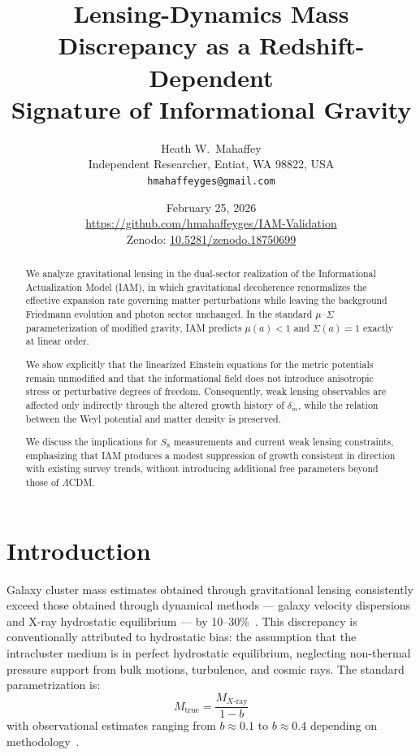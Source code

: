 \documentclass[12pt,a4paper]{article}
\title{Lensing-Dynamics Mass Discrepancy as a Redshift-Dependent\\
Signature of Informational Gravity}
\author{Heath W.\ Mahaffey\\
\small Independent Researcher, Entiat, WA 98822, USA\\
\small \texttt{hmahaffeyges@gmail.com}}
\date{February 25, 2026\\
\small \url{https://github.com/hmahaffeyges/IAM-Validation}\\
\small Zenodo: \href{https://doi.org/10.5281/zenodo.18750699}{10.5281/zenodo.18750699}}
\begin{document}
\maketitle


\begin{abstract}
We analyze gravitational lensing in the dual-sector realization of the
Informational Actualization Model (IAM), in which gravitational decoherence
renormalizes the effective expansion rate governing matter perturbations
while leaving the background Friedmann evolution and photon sector unchanged.
In the standard $\mu$--$\Sigma$ parameterization of modified gravity,
IAM predicts $\mu(a) < 1$ and $\Sigma(a) = 1$ exactly at linear order.

We show explicitly that the linearized Einstein equations for the metric
potentials remain unmodified and that the informational field does not
introduce anisotropic stress or perturbative degrees of freedom.
Consequently, weak lensing observables are affected only indirectly through
the altered growth history of $\delta_m$, while the relation between the
Weyl potential and matter density is preserved.

We discuss the implications for $S_8$ measurements and current weak lensing
constraints, emphasizing that IAM produces a modest suppression of growth
consistent in direction with existing survey trends, without introducing
additional free parameters beyond those of $\Lambda$CDM.
\end{abstract}


\section{Introduction}

\sloppy
Galaxy cluster mass estimates obtained through gravitational lensing consistently
exceed those obtained through dynamical methods --- galaxy velocity dispersions
and X-ray hydrostatic equilibrium --- by 10--30\%~\citep{Mahdavi2013,Israel2014,
Hoekstra2015,vonDerLinden2014,Smith2016}. This discrepancy is conventionally
attributed to hydrostatic bias: the assumption that the intracluster medium is
in perfect hydrostatic equilibrium, neglecting non-thermal pressure support from
bulk motions, turbulence, and cosmic rays. The standard parametrization is:
\begin{equation}
M_\mathrm{true} = \frac{M_{X\text{-ray}}}{1-b}
\end{equation}
with observational estimates ranging from $b \approx 0.1$ to $b \approx 0.4$
depending on methodology~\citep{Nagai2007,Rasia2012,Biffi2016}.
\end{document}
